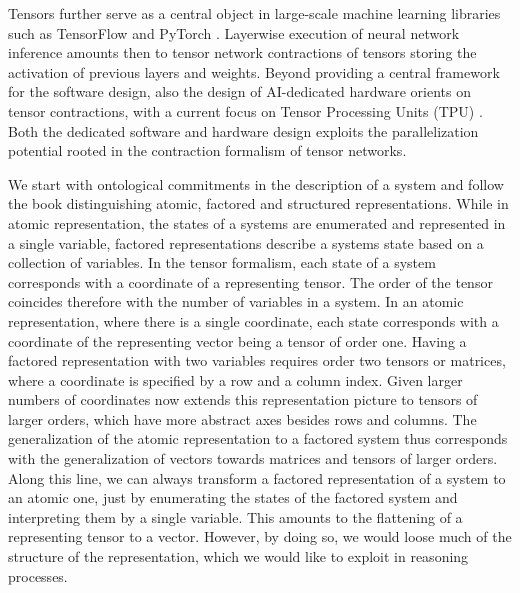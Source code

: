 Tensors further serve as a central object in large-scale machine learning libraries such as TensorFlow \cite{abadi_tensorflow_2016} and PyTorch \cite{paszke_pytorch_2019}.
Layerwise execution of neural network inference amounts then to tensor network contractions of tensors storing the activation of previous layers and weights.
Beyond providing a central framework for the software design, also the design of AI-dedicated hardware orients on tensor contractions, with a current focus on Tensor Processing Units (TPU) \cite{nikolic_survey_2022,jouppi_tpu_2023}.
Both the dedicated software and hardware design exploits the parallelization potential rooted in the contraction formalism of tensor networks.


We start with ontological commitments in the description of a system and follow the book \cite{russell_artificial_2021} distinguishing atomic, factored and structured representations.
While in atomic representation, the states of a systems are enumerated and represented in a single variable, factored representations describe a systems state based on a collection of variables.
In the tensor formalism, each state of a system corresponds with a coordinate of a representing tensor.
The order of the tensor coincides therefore with the number of variables in a system.
In an atomic representation, where there is a single coordinate, each state corresponds with a coordinate of the representing vector being a tensor of order one.
Having a factored representation with two variables requires order two tensors or matrices, where a coordinate is specified by a row and a column index.
Given larger numbers of coordinates now extends this representation picture to tensors of larger orders, which have more abstract axes besides rows and columns.
The generalization of the atomic representation to a factored system thus corresponds with the generalization of vectors towards matrices and tensors of larger orders.
Along this line, we can always transform a factored representation of a system to an atomic one, just by enumerating the states of the factored system and interpreting them by a single variable.
This amounts to the flattening of a representing tensor to a vector.
However, by doing so, we would loose much of the structure of the representation, which we would like to exploit in reasoning processes.

